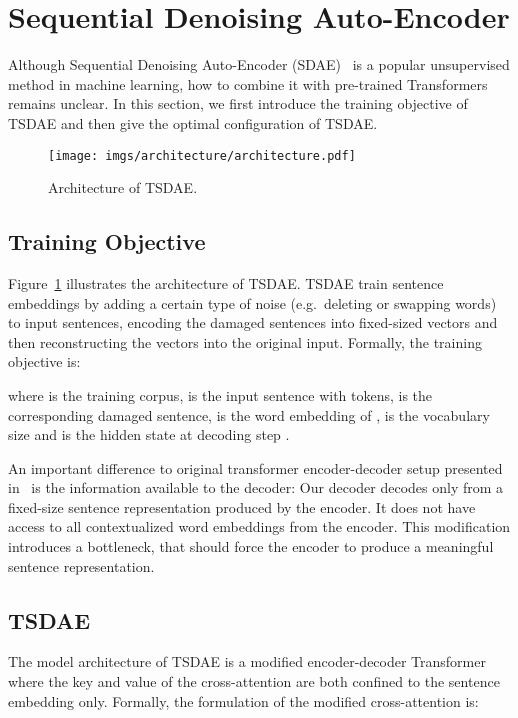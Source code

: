 \documentclass[11pt,a4paper]{article}
\begin{document}
\section{Sequential Denoising Auto-Encoder} 
Although Sequential Denoising Auto-Encoder (SDAE)~\citep{DBLP:journals/jmlr/VincentLLBM10,Goodfellow-et-al-2016,DBLP:conf/naacl/HillCK16} is a popular unsupervised method in machine learning, how to combine it with pre-trained Transformers remains unclear. In this section, we first introduce the training objective of TSDAE and then give the optimal configuration of TSDAE.

\begin{figure}[t]
  \centering
  \texttt{[image: imgs/architecture/architecture.pdf]}
  \caption{Architecture of TSDAE.}
  \label{fig:architecture}
\end{figure}


\subsection{Training Objective}
Figure~\ref{fig:architecture} illustrates the architecture of TSDAE. TSDAE train sentence embeddings by adding a certain type of noise (e.g.\ deleting or swapping words) to input sentences, encoding the damaged sentences into fixed-sized vectors and then reconstructing the vectors into the original input. Formally, the training objective is:

where  is the training corpus,  is the input sentence with  tokens,  is the corresponding damaged sentence,  is the word embedding of ,  is the vocabulary size and  is the hidden state at decoding step . 

An important difference to original transformer encoder-decoder setup presented in~\citet{DBLP:conf/nips/VaswaniSPUJGKP17} is the information available to the decoder: Our decoder decodes only from a fixed-size sentence representation produced by the encoder. It does not have access to all contextualized word embeddings from the encoder. This modification introduces a bottleneck, that should force the encoder to produce a meaningful sentence representation. 


\subsection{TSDAE}

The model architecture of TSDAE is a modified encoder-decoder Transformer where the key and value of the cross-attention are both confined to the sentence embedding only. Formally, the formulation of the modified cross-attention is:
\end{document}
